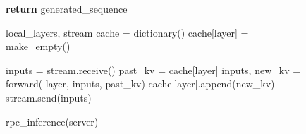 \begin{figure*}[tb]
\begin{minipage}{0.56\textwidth}
\begin{algorithm}[H]
\begin{algorithmic}[1]
  \STATE \textbf{return} generated\_sequence

\end{algorithmic}
\end{algorithm}
\vspace{-18px}
\end{minipage}\hspace{8px}
\begin{minipage}{0.42\textwidth}

\vspace{-10px}
\begin{algorithm}[H]
  \caption{{\color{blue}rpc\_inference}(server)}
  \label{alg:rpc}
\begin{algorithmic}[1]
  \REQUIRE local\_layers, stream
  \STATE cache = dictionary()
    \STATE cache[layer] = make\_empty()
  \ENDFOR

    \STATE inputs = stream.receive()
      \STATE past\_kv = cache[layer]
      \STATE inputs, new\_kv = forward(
      \STATE \hspace{16px} layer, inputs, past\_kv)
      \STATE cache[layer].append(new\_kv)
    \ENDFOR
    \STATE stream.send(inputs)
  \ENDWHILE
  

\end{algorithmic}
\end{algorithm}
\end{minipage}
\end{figure*}
